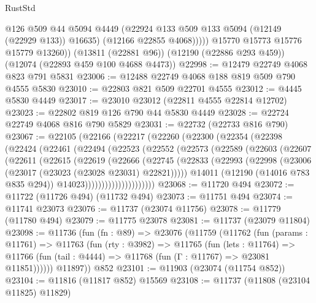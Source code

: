 \begin{lexlean}{RustStd}
\begin{coremodule}
                @126
                @509
                @44
                @5094
                @4449
                (@22924 @133 @509 @133 @5094 (@12149 (@22929 @133)) @16635)
                (@12166 @22855 @4068)))))
        @15770
        @15773
        @15776
        @15779
        @13260))
    (@13811 (@22881 @96))
    (@12190 (@22886 @293 @459))
    (@12074 (@22893 @459 @100 @4688 @4473))
@22998 := @12479 @22749 @4068 @823 @791 @5831
@23006 := @12488 @22749 @4068 @188 @819 @509 @790 @4555 @5830
@23010 := @22803 @821 @509 @22701 @4555
@23012 := @4445 @5830 @4449
@23017 := @23010 @23012 (@22811 @4555 @22814 @12702)
@23023 := @22802 @819 @126 @790 @44 @5830 @4449
@23028 := @22724 @22749 @4068 @816 @790 @5829
@23031 := @22732 (@22733 @816 @790)
@23067 := @22105
    (@22166
      (@22217
        (@22260
          (@22300
            (@22354
              (@22398
                (@22424
                  (@22461
                    (@22494
                      (@22523
                        (@22552
                          (@22573
                            (@22589
                              (@22603
                                (@22607
                                  (@22611
                                    (@22615
                                      (@22619
                                        (@22666
                                          (@22745
                                            (@22833
                                              (@22993
                                                (@22998
                                                  (@23006
                                                    (@23017 (@23023 (@23028 @23031) @22821)))))
                                              @14011
                                              (@12190 (@14016 @783 @835 @294))
                                              @14023)))))))))))))))))))))
@23068 := @11720 @494
@23072 := @11722 (@11726 @494) (@11732 @494)
@23073 := @11751 @494
@23074 := @11741 @23073
@23076 := @11737 (@23074 @11756)
@23078 := @11779 (@11780 @494)
@23079 := @11775 @23078
@23081 := @11737 (@23079 @11804)
@23098 := @11736
    (fun (fn : @89) =>
    @23076
      (@11759
        (@11762
          (fun (params : @11761) =>
          @11763
            (fun (rty : @3982) =>
            @11765
              (fun (lets : @11764) =>
              @11766 (fun (tail : @4444) => @11768 (fun (Γ : @11767) => @23081 @11851))))))
        @11897))
    @852
@23101 := @11903 (@23074 (@11754 @852))
@23104 := @11816 (@11817 @852) @15569
@23108 := @11737 (@11808 (@23104 @11825) @11829)

\end{coremodule}
\end{lexlean}
